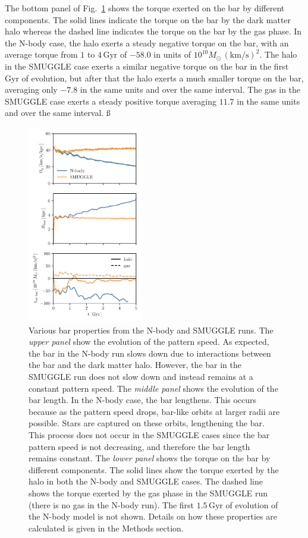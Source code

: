 \documentclass{natureprintstyle}
\begin{document}
The bottom panel of Fig.~\ref{fig:prop} shows the torque exerted on the bar by
different components. The solid lines indicate the torque on the bar by the
dark matter halo whereas the dashed line indicates the torque on the bar by
the gas phase. In the N-body case, the halo exerts a steady negative torque on
the bar, with an average torque from $1$ to $4\,\textrm{Gyr}$ of $-58.0$ in
units of $10^{10}M_{\odot}\,(\textrm{km}/\textrm{s})^2$. The halo in the
SMUGGLE case exerts a similar negative torque on the bar in the first Gyr of
evolution, but after that the halo exerts a much smaller torque on the bar,
averaging only $-7.8$ in the same units and over the same interval. The gas in
the SMUGGLE case exerts a steady positive torque averaging $11.7$ in the same
units and over the same interval.
ß
\begin{figure}[h]%
\centering
\includegraphics[width=0.45\textwidth]{fig/fig2.pdf}
\caption{Various bar properties from the N-body and SMUGGLE runs. The
\textit{upper panel} show the evolution of the pattern speed. As expected, the
bar in the N-body run slows down due to interactions between the bar and the
dark matter halo. However, the bar in the SMUGGLE run does not slow down and
instead remains at a constant pattern speed. The \textit{middle panel} shows
the evolution of the bar length. In the N-body case, the bar lengthens. This
occurs because as the pattern speed drops, bar-like orbits at larger radii are
possible. Stars are captured on these orbits, lengthening the bar. This
process does not occur in the SMUGGLE cases since the bar pattern speed is not
decreasing, and therefore the bar length remains constant. The \textit{lower
panel} shows the torque on the bar by different components. The solid lines
show the torque exerted by the halo in both the N-body and SMUGGLE cases. The
dashed line shows the torque exerted by the gas phase in the SMUGGLE run
(there is no gas in the N-body run). The first $1.5\,\textrm{Gyr}$ of
evolution of the N-body model is not shown. Details on how these properties
are calculated is given in the Methods section.}\label{fig:prop}
\end{figure}
\end{document}
